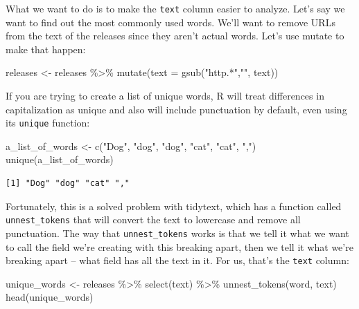 \documentclass[
  letterpaper,
  DIV=11,
  numbers=noendperiod]{scrreprt}
\newenvironment{Shaded}{\begin{snugshade}}{\end{snugshade}}
\newcommand{\AttributeTok}[1]{\textcolor[rgb]{0.40,0.45,0.13}{#1}}
\newcommand{\FunctionTok}[1]{\textcolor[rgb]{0.28,0.35,0.67}{#1}}
\newcommand{\NormalTok}[1]{\textcolor[rgb]{0.00,0.23,0.31}{#1}}
\newcommand{\OtherTok}[1]{\textcolor[rgb]{0.00,0.23,0.31}{#1}}
\newcommand{\SpecialCharTok}[1]{\textcolor[rgb]{0.37,0.37,0.37}{#1}}
\newcommand{\StringTok}[1]{\textcolor[rgb]{0.13,0.47,0.30}{#1}}
\begin{document}
What we want to do is to make the \texttt{text} column easier to
analyze. Let's say we want to find out the most commonly used words.
We'll want to remove URLs from the text of the releases since they
aren't actual words. Let's use mutate to make that happen:

\begin{Shaded}
\begin{Highlighting}[]
\NormalTok{releases }\OtherTok{\textless{}{-}}\NormalTok{ releases }\SpecialCharTok{\%\textgreater{}\%}
  \FunctionTok{mutate}\NormalTok{(}\AttributeTok{text =} \FunctionTok{gsub}\NormalTok{(}\StringTok{"http.*"}\NormalTok{,}\StringTok{""}\NormalTok{, text))}
\end{Highlighting}
\end{Shaded}

If you are trying to create a list of unique words, R will treat
differences in capitalization as unique and also will include
punctuation by default, even using its \texttt{unique} function:

\begin{Shaded}
\begin{Highlighting}[]
\NormalTok{a\_list\_of\_words }\OtherTok{\textless{}{-}} \FunctionTok{c}\NormalTok{(}\StringTok{"Dog"}\NormalTok{, }\StringTok{"dog"}\NormalTok{, }\StringTok{"dog"}\NormalTok{, }\StringTok{"cat"}\NormalTok{, }\StringTok{"cat"}\NormalTok{, }\StringTok{","}\NormalTok{)}
\FunctionTok{unique}\NormalTok{(a\_list\_of\_words)}
\end{Highlighting}
\end{Shaded}

\begin{verbatim}
[1] "Dog" "dog" "cat" ","  
\end{verbatim}

Fortunately, this is a solved problem with tidytext, which has a
function called \texttt{unnest\_tokens} that will convert the text to
lowercase and remove all punctuation. The way that
\texttt{unnest\_tokens} works is that we tell it what we want to call
the field we're creating with this breaking apart, then we tell it what
we're breaking apart -- what field has all the text in it. For us,
that's the \texttt{text} column:

\begin{Shaded}
\begin{Highlighting}[]
\NormalTok{unique\_words }\OtherTok{\textless{}{-}}\NormalTok{ releases }\SpecialCharTok{\%\textgreater{}\%} \FunctionTok{select}\NormalTok{(text) }\SpecialCharTok{\%\textgreater{}\%}
  \FunctionTok{unnest\_tokens}\NormalTok{(word, text)}
\FunctionTok{head}\NormalTok{(unique\_words)}
\end{Highlighting}
\end{Shaded}
\end{document}
